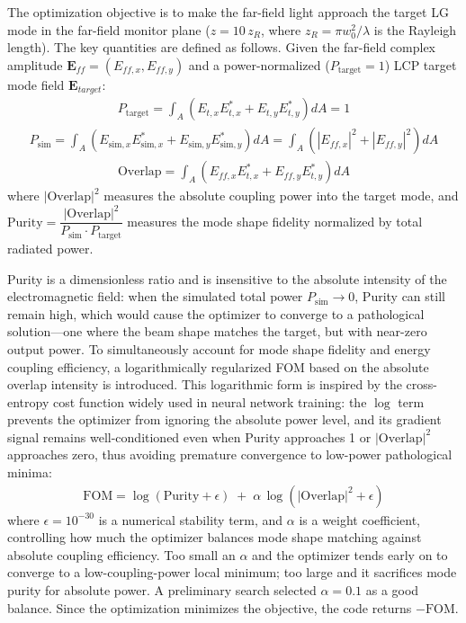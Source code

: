 The optimization objective is to make the far-field light approach the target LG mode in the far-field monitor plane ($z = 10\,z_R$, where $z_R = \pi w_0^2/\lambda$ is the Rayleigh length). The key quantities are defined as follows. Given the far-field complex amplitude $\mathbf{E}_{ff} = (E_{ff,x}, E_{ff,y})$ and a power-normalized ($P_{\text{target}}=1$) LCP target mode field $\mathbf{E}_{target}$:
\begin{align}
P_{\text{target}} = \int_A \left( E_{t,x} E_{t,x}^* + E_{t,y} E_{t,y}^* \right) dA = 1
\end{align}
\begin{align}
P_{\text{sim}} = \int_A \left( E_{\text{sim},x} E_{\text{sim},x}^* + E_{\text{sim},y} E_{\text{sim},y}^* \right) dA = \int_A \left( |E_{ff,x}|^2 + |E_{ff,y}|^2 \right) dA
\end{align}
\begin{align}
\text{Overlap} = \int_A \left( E_{ff,x} E_{t,x}^* + E_{ff,y} E_{t,y}^* \right) dA \label{eq:overlap_def}
\end{align}
where $|\text{Overlap}|^2$ measures the absolute coupling power into the target mode, and $\text{Purity} = \dfrac{|\text{Overlap}|^2}{P_{\text{sim}} \cdot P_{\text{target}}}$ measures the mode shape fidelity normalized by total radiated power.

Purity is a dimensionless ratio and is insensitive to the absolute intensity of the electromagnetic field: when the simulated total power $P_{\text{sim}}\to 0$, Purity can still remain high, which would cause the optimizer to converge to a pathological solution---one where the beam shape matches the target, but with near-zero output power. To simultaneously account for mode shape fidelity and energy coupling efficiency, a logarithmically regularized FOM based on the absolute overlap intensity is introduced. This logarithmic form is inspired by the cross-entropy cost function widely used in neural network training: the $\log$ term prevents the optimizer from ignoring the absolute power level, and its gradient signal remains well-conditioned even when Purity approaches 1 or $|\text{Overlap}|^2$ approaches zero, thus avoiding premature convergence to low-power pathological minima:
\begin{align}
\text{FOM} = \log\!\left (\text{Purity}+\epsilon\right) \;+\; \alpha\,\log\!\left (|\text{Overlap}|^2+\epsilon\right)
\end{align}
where $\epsilon = 10^{-30}$ is a numerical stability term, and $\alpha$ is a weight coefficient, controlling how much the optimizer balances mode shape matching against absolute coupling efficiency. Too small an $\alpha$ and the optimizer tends early on to converge to a low-coupling-power local minimum; too large and it sacrifices mode purity for absolute power. A preliminary search selected $\alpha = 0.1$ as a good balance. Since the optimization minimizes the objective, the code returns $-\text{FOM}$.


